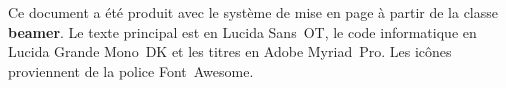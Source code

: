 {

  \begin{frame}[plain]
    \advance\textwidth-10mm
    \hsize\textwidth
    \columnwidth\textwidth %
    \scriptsize\color{lightgray} %
    \vfill
    \begin{center}
      \begin{minipage}{0.7\textwidth}
        \raggedright %
        Ce document a été produit avec le système de mise en page
        {\XeLaTeX} à partir de la classe \textbf{beamer}. Le texte
        principal est en Lucida Sans~OT, le code informatique en
        Lucida Grande Mono~DK et les titres en Adobe Myriad~Pro. Les
        icônes proviennent de la police Font~Awesome.
      \end{minipage}
    \end{center}
    \vfill
  \end{frame}
}

